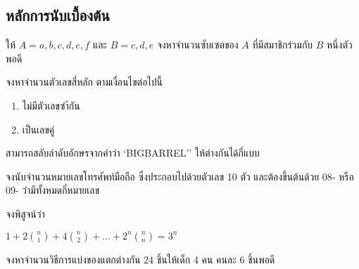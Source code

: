 \subsection*{หลักการนับเบื้องต้น}
\begin{exercise}
ให้ $A={a,b,c,d,e,f}$ และ $B={c,d,e}$ จงหาจำนวนซับเซตของ $A$ ที่มีสมาชิกร่วมกับ $B$  หนึ่งตัวพอดี
\end{exercise}
\begin{exercise}
จงหาจำนวนตัวเลขสี่หลัก ตามเงื่อนไขต่อไปนี้
\begin{enumerate}
\item ไม่มีตัวเลขซำ้กัน
\item เป็นเลขคู่
\end{enumerate}
\end{exercise}
\begin{exercise}
สามารถสลับลำดับอักษรจากคำว่า `BIGBARREL'' ให้ต่างกันได้กี่แบบ
\end{exercise}
\begin{exercise}
จงนับจำนวนหมายเลขโทรศัพท์มือถือ ซึ่งประกอบไปด้วยตัวเลข 10 ตัว และต้องขึ้นต้นด้วย 08- หรือ 09- ว่ามีทั้งหมดกี่หมายเลข
\end{exercise}
\begin{exercise}
จงพิสูจน์ว่า
\begin{center}
$1+2\binom{n}{1}+4\binom{n}{2}+...+2^n\binom{n}{n} = 3^n$
\end{center}
\end{exercise}
\begin{exercise}
จงหาจำนวนวิธีการแบ่งของแตกต่างกัน 24 ชิ้นให้เด็ก 4 คน คนละ 6 ชิ้นพอดี
\end{exercise}


